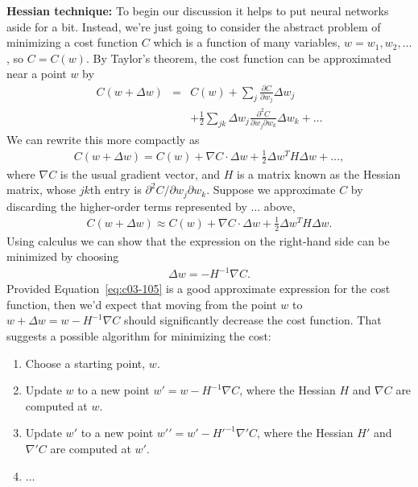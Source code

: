 \textbf{Hessian technique:} To begin our discussion it helps to put neural networks aside for a bit. Instead, we're just going to consider the abstract problem of minimizing a cost function $C$ which is a function of many variables, $w = w_1, w_2, \ldots$, so $C = C(w)$. By Taylor's theorem, the cost function can be approximated near a point $w$ by 
\begin{eqnarray} C(w+\Delta w)
& = & C(w) + \sum_j \frac{\partial C}{\partial w_j} \Delta w_j \nonumber \\ 
& & + \frac{1}{2} \sum_{jk} \Delta w_j \frac{\partial^2 C}{\partial w_j \partial w_k} \Delta w_k + \ldots 
\label{eq:c03-103}
\end{eqnarray} 
We can rewrite this more compactly as 
\begin{eqnarray} 
C(w+\Delta w) = C(w) + \nabla C \cdot \Delta w + \frac{1}{2} \Delta w^T H \Delta w + \ldots, 
\label{eq:c03-104}
\end{eqnarray} 
where $\nabla C$ is the usual gradient vector, and $H$ is a matrix known as the Hessian matrix, whose $jk$th entry is $\partial^2 C / \partial w_j \partial w_k$. Suppose we approximate $C$ by discarding the higher-order terms represented by $\ldots$ above, 
\begin{eqnarray} 
C(w+\Delta w) \approx C(w) + \nabla C \cdot \Delta w + \frac{1}{2} \Delta w^T H \Delta w. 
\label{eq:c03-105}
\end{eqnarray} 
Using calculus we can show that the expression on the right-hand side can be minimized by choosing 
\begin{eqnarray} \Delta w = -H^{-1} \nabla C. 
    \label{eq:c03-106}
\end{eqnarray} 
Provided Equation~\ref{eq:c03-105} is a good approximate expression for the cost function, then we'd expect that moving from the point $w$ to $w+\Delta w = w-H^{-1} \nabla C$ should significantly decrease the cost function. That suggests a possible algorithm for minimizing the cost:

\begin{enumerate}
\item 
Choose a starting point, $w$.
    
\item 
Update $w$ to a new point $w' = w-H^{-1} \nabla C$, where the Hessian $H$ and $\nabla C$ are computed at $w$.
        
\item 
Update $w'$ to a new point $w{'}{'} = w'-H'^{-1} \nabla' C$, where the Hessian $H'$ and $\nabla' C$ are computed at $w'$.
        
\item 
$\ldots$ 
    
\end{enumerate}

